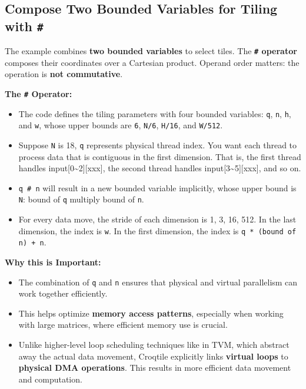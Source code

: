 \subsection*{Compose Two Bounded Variables for Tiling with \texttt{\#}}

The example combines \textbf{two bounded variables} to select tiles. The \textbf{\texttt{\#} operator} composes their coordinates over a Cartesian product. Operand order matters: the operation is \textbf{not commutative}.

\noindent\textbf{The \texttt{\#} Operator:}\par

\begin{itemize}[leftmargin=1.6em]
\item The code defines the tiling parameters with four bounded variables: \texttt{q}, \texttt{n}, \texttt{h}, and \texttt{w}, whose upper bounds are \texttt{6}, \texttt{N/6}, \texttt{H/16}, and \texttt{W/512}.
\item Suppose \texttt{N} is 18, \texttt{q} represents physical thread index. You want each thread to process data that is contiguous in the first dimension. That is, the first thread handles input[0\textasciitilde{}2][xxx], the second thread handles input[3\textasciitilde{}5][xxx], and so on.
\item \texttt{q \# n} will result in a new bounded variable implicitly, whose upper bound is \texttt{N}: bound of \texttt{q} multiply bound of \texttt{n}.
\item For every data move, the stride of each dimension is 1, 3, 16, 512. In the last dimension, the index is \texttt{w}. In the first dimension, the index is \texttt{q * (bound of n) + n}.
\end{itemize}

\noindent\textbf{Why this is Important:}\par

\begin{itemize}[leftmargin=1.6em]
\item The combination of \texttt{q} and \texttt{n} ensures that physical and virtual parallelism can work together efficiently.
\item This helps optimize \textbf{memory access patterns}, especially when working with large matrices, where efficient memory use is crucial.
\item Unlike higher-level loop scheduling techniques like in TVM, which abstract away the actual data movement, Croqtile explicitly links \textbf{virtual loops} to \textbf{physical DMA operations}. This results in more efficient data movement and computation.
\end{itemize}
